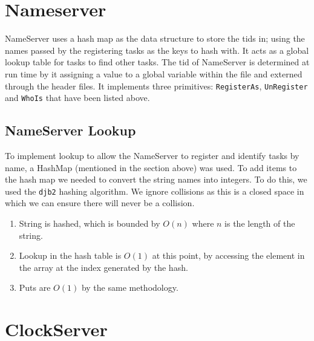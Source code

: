 \documentclass[12pt]{article}
\begin{document}
\section{Nameserver}
NameServer uses a hash map as the data structure to store the tids in; using the names passed by the registering tasks as the keys to hash with.  It acts as a global lookup table for tasks to find other tasks.  The tid of NameServer is determined at run time by it assigning a value to a global variable within the file and externed through the header files.  It implements three primitives: \texttt{RegisterAs}, \texttt{UnRegister} and \texttt{WhoIs} that have been listed above.
\\
\subsection{NameServer Lookup}
To implement lookup to allow the NameServer to register and identify tasks by name, a HashMap (mentioned in the section above) was used.  To add items to the hash map we needed to convert the string names into integers.  To do this, we used the \texttt{djb2} hashing algorithm.  We ignore collisions as this is a closed space in which we can ensure there will never be a collision.
\begin{enumerate}
  \item String is hashed, which is bounded by $O(n)$ where $n$ is the length of the string.
  \item Lookup in the hash table is $O(1)$ at this point, by accessing the element in the array at the index generated by the hash.
  \item Puts are $O(1)$ by the same methodology.
    \\[2\baselineskip]
\end{enumerate}

\section{ClockServer}
\end{document}
